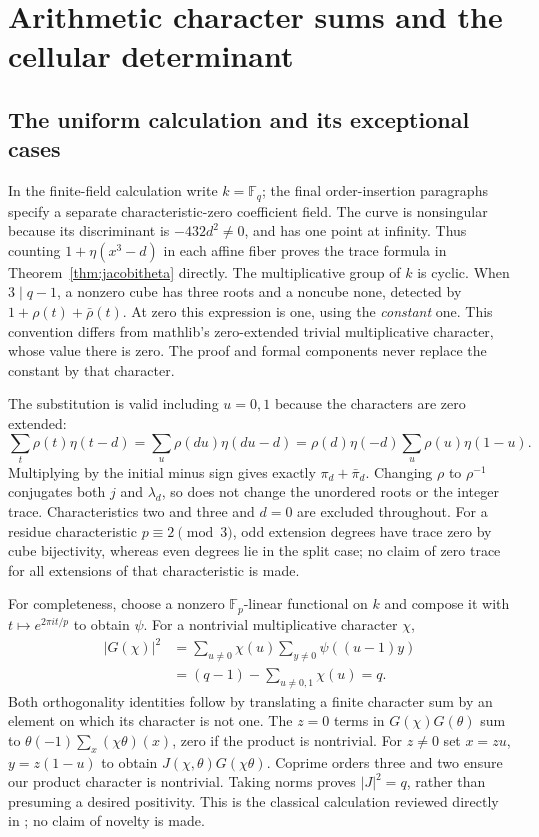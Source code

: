 \chapter{Arithmetic character sums and the cellular determinant}
\section{The uniform calculation and its exceptional cases}
In the finite-field calculation write $k=\mathbb F_q$; the final order-insertion paragraphs specify a separate characteristic-zero coefficient field. The curve is nonsingular because its discriminant is $-432d^2\ne0$, and has one point at infinity. Thus counting $1+\eta(x^3-d)$ in each affine fiber proves the trace formula in Theorem~\ref{thm:jacobitheta} directly. The multiplicative group of $k$ is cyclic. When $3\mid q-1$, a nonzero cube has three roots and a noncube none, detected by $1+\rho(t)+\bar\rho(t)$. At zero this expression is one, using the \emph{constant} one. This convention differs from mathlib's zero-extended trivial multiplicative character, whose value there is zero. The proof and formal components never replace the constant by that character.

The substitution is valid including $u=0,1$ because the characters are zero extended:
\[
 \sum_t\rho(t)\eta(t-d)
 =\sum_u\rho(du)\eta(du-d)
 =\rho(d)\eta(-d)\sum_u\rho(u)\eta(1-u).
\]
Multiplying by the initial minus sign gives exactly $\pi_d+\bar\pi_d$. Changing $\rho$ to $\rho^{-1}$ conjugates both $j$ and $\lambda_d$, so does not change the unordered roots or the integer trace. Characteristics two and three and $d=0$ are excluded throughout. For a residue characteristic $p\equiv2\pmod3$, odd extension degrees have trace zero by cube bijectivity, whereas even degrees lie in the split case; no claim of zero trace for all extensions of that characteristic is made.

For completeness, choose a nonzero $\mathbb F_p$-linear functional on $k$ and compose it with $t\mapsto e^{2\pi it/p}$ to obtain $\psi$. For a nontrivial multiplicative character $\chi$,
\[
 \begin{aligned}
 |G(\chi)|^2
 &=\sum_{u\ne0}\chi(u)\sum_{y\ne0}\psi((u-1)y)\\
 &=(q-1)-\sum_{u\ne0,1}\chi(u)=q.
 \end{aligned}
\]
Both orthogonality identities follow by translating a finite character sum by an element on which its character is not one. The $z=0$ terms in $G(\chi)G(\theta)$ sum to $\theta(-1)\sum_x(\chi\theta)(x)$, zero if the product is nontrivial. For $z\ne0$ set $x=zu$, $y=z(1-u)$ to obtain $J(\chi,\theta)G(\chi\theta)$. Coprime orders three and two ensure our product character is nontrivial. Taking norms proves $|J|^2=q$, rather than presuming a desired positivity. This is the classical calculation reviewed directly in \cite{WeilJacobi}; no claim of novelty is made.

